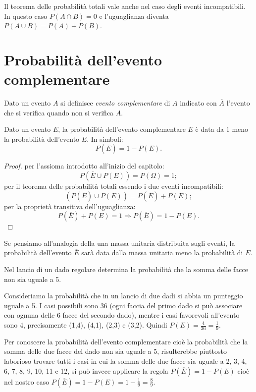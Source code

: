 \osservazione Il teorema delle probabilità totali vale anche nel caso degli 
eventi incompatibili. In questo caso $P(A\cap B)=0$ e l'uguaglianza diventa 
$P(A\cup B)=P(A)+P(B)$.


\section{Probabilità dell'evento complementare}
\label{sec:09_complementare}

Dato un evento $A$ si definisce \emph{evento complementare} di $A$ indicato 
con 
$\overline A$ l'evento che si verifica quando non si verifica $A$.
\begin{teorema}
Dato un evento $E$, la probabilità dell'evento complementare $\overline E$ 
è 
data da $1$ meno la probabilità dell'evento $E$. In simboli: \[ P(\overline 
E)=1-P(E). \]
\end{teorema}
\begin{proof} per l'assioma introdotto all'inizio del capitolo: \[ 
P(\overline 
E\cup P(E))=P(\Omega )=1; \]
per il teorema delle probabilità totali essendo i due eventi incompatibili: 
\[ 
(P(\overline E)\cup P(E))=P(\overline E)+P(E); \]
per la proprietà transitiva dell'uguaglianza: \[ P(\overline E)+P(E)=1 
\Rightarrow P(\overline E)=1-P(E). \]
\end{proof}

Se pensiamo all'analogia della una massa unitaria distribuita sugli eventi, 
la 
probabilità dell'evento $\overline E$ sarà data dalla massa unitaria meno 
la 
probabilità di $E$.

\begin{esempio}
Nel lancio di un dado regolare determina la probabilità che la somma delle 
facce 
non sia uguale a 5.

Consideriamo la probabilità che in un lancio di due dadi si abbia un 
punteggio 
uguale a 5. I casi possibili sono 36 (ogni faccia del primo dado si può 
associare con ognuna delle 6 facce del secondo dado), mentre i casi 
favorevoli 
all'evento sono 4, precisamente (1,4), (4,1), (2,3) e (3,2). Quindi 
$P(E)=\frac 
4{36}=\frac 1 9$.

Per conoscere la probabilità dell'evento complementare cioè la probabilità 
che 
la somma delle due facce del dado non sia uguale a 5, risulterebbe 
piuttosto 
laborioso trovare tutti i casi in cui la somma delle due facce sia uguale a 
2, 
3, 4, 6, 7, 8, 9, 10, 11 e 12, si può invece applicare la regola 
$P(\overline 
E)=1-P(E)$ cioè nel nostro caso $P(\overline E)=1-P(E)=1-\frac 1 9=\frac 8 
9$.
\end{esempio}

